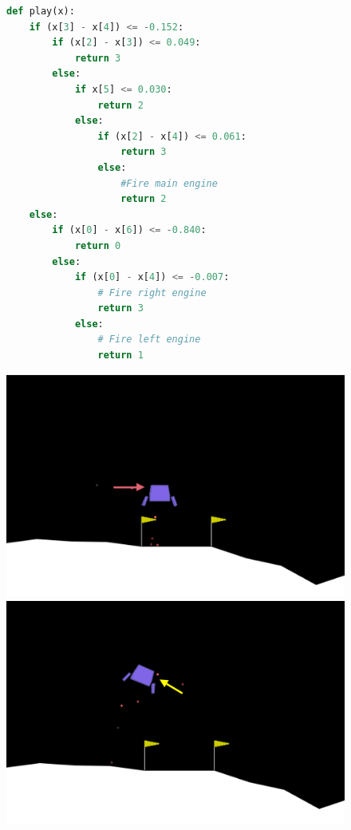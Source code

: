 \begin{figure}
\centering
\begin{minipage}{0.545\textwidth}
\begin{tcolorbox}
\begin{lstlisting}[language=Python]
def play(x):
    if (x[3] - x[4]) <= -0.152:
        if (x[2] - x[3]) <= 0.049:
            return 3
        else:
            if x[5] <= 0.030:
                return 2
            else:
                if (x[2] - x[4]) <= 0.061:
                    return 3
                else:
                    #Fire main engine
                    return 2
    else:
        if (x[0] - x[6]) <= -0.840:
            return 0
        else:
            if (x[0] - x[4]) <= -0.007:
                # Fire right engine
                return 3
            else:
                # Fire left engine
                return 1
\end{lstlisting}
\end{tcolorbox}
\end{minipage}
\hfill
\begin{minipage}{0.43\textwidth}
    \includegraphics[trim={0 0 0 0},clip,scale=0.24]{images/images_part3/ll_d.png}
    \includegraphics[scale=0.24]{images/images_part3/ll_b.png}

\end{minipage}
\end{figure}
